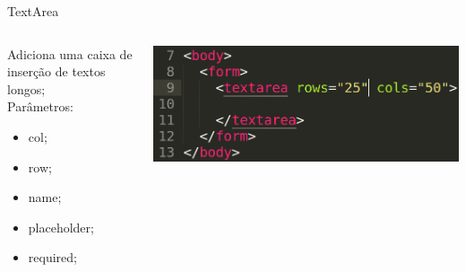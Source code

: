 \documentclass{beamer}
\begin{document}
\begin{frame}{TextArea}
    \begin{columns}
    \begin{column}{0.4 \textwidth}
      \small
      Adiciona uma caixa de inserção de textos longos;\\
      Parâmetros:
     \begin{itemize}
       \item col;
        \item row;
        \item name;
        \item placeholder;
        \item required;
     \end{itemize}
    \end{column}
    
    \begin{column}{0.5\textwidth}
     \includegraphics[height=0.25\paperheight]{fig/aula3/aula4_8.png}
    \end{column}
  \end{columns}
\end{frame}
\end{document}
